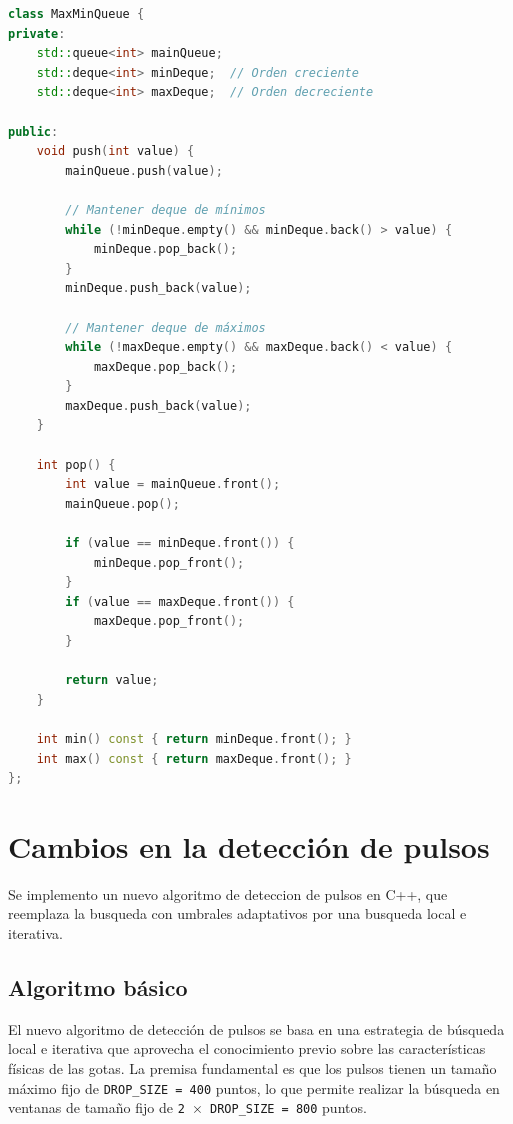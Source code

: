 \documentclass[12pt,a4paper]{article}
\begin{document}
\begin{lstlisting}[language=C++, label=lst:maxminqueue_simple, caption={MaxMinQueue.hpp - Implementación completa de MaxMinQueue con dos deques auxiliares}]
class MaxMinQueue {
private:
    std::queue<int> mainQueue;
    std::deque<int> minDeque;  // Orden creciente
    std::deque<int> maxDeque;  // Orden decreciente

public:
    void push(int value) {
        mainQueue.push(value);
        
        // Mantener deque de mínimos
        while (!minDeque.empty() && minDeque.back() > value) {
            minDeque.pop_back();
        }
        minDeque.push_back(value);
        
        // Mantener deque de máximos
        while (!maxDeque.empty() && maxDeque.back() < value) {
            maxDeque.pop_back();
        }
        maxDeque.push_back(value);
    }
    
    int pop() {
        int value = mainQueue.front();
        mainQueue.pop();
        
        if (value == minDeque.front()) {
            minDeque.pop_front();
        }
        if (value == maxDeque.front()) {
            maxDeque.pop_front();
        }
        
        return value;
    }
    
    int min() const { return minDeque.front(); }
    int max() const { return maxDeque.front(); }
};
\end{lstlisting}

\section{Cambios en la detección de pulsos}
\lhead{}

Se implemento un nuevo algoritmo de deteccion de pulsos en C++, que reemplaza la busqueda con umbrales adaptativos por una busqueda local e iterativa.

\subsection{Algoritmo básico}

El nuevo algoritmo de detección de pulsos se basa en una estrategia de búsqueda local e iterativa que aprovecha el conocimiento previo sobre las características físicas de las gotas. La premisa fundamental es que los pulsos tienen un tamaño máximo fijo de \texttt{DROP\_SIZE = 400} puntos, lo que permite realizar la búsqueda en ventanas de tamaño fijo de \texttt{2 $\times$ DROP\_SIZE = 800} puntos.
\end{document}
